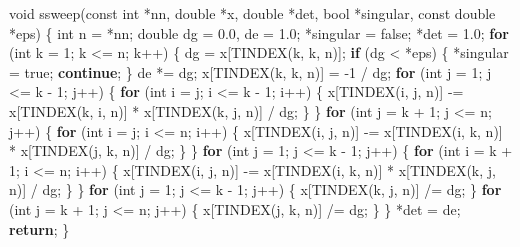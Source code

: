 \documentclass[12pt,]{article}
\newenvironment{Shaded}{\begin{snugshade}}{\end{snugshade}}
\newcommand{\ControlFlowTok}[1]{\textcolor[rgb]{0.13,0.29,0.53}{\textbf{#1}}}
\newcommand{\DataTypeTok}[1]{\textcolor[rgb]{0.13,0.29,0.53}{#1}}
\newcommand{\DecValTok}[1]{\textcolor[rgb]{0.00,0.00,0.81}{#1}}
\newcommand{\FloatTok}[1]{\textcolor[rgb]{0.00,0.00,0.81}{#1}}
\newcommand{\NormalTok}[1]{#1}
\begin{document}
\begin{Shaded}
\begin{Highlighting}[]
{{{{{{\DataTypeTok{void}\NormalTok{ ssweep(}\DataTypeTok{const} \DataTypeTok{int}\NormalTok{ *nn, }\DataTypeTok{double}\NormalTok{ *x, }\DataTypeTok{double}\NormalTok{ *det, }\DataTypeTok{bool}\NormalTok{ *singular,}
            \DataTypeTok{const} \DataTypeTok{double}\NormalTok{ *eps) \{}
  \DataTypeTok{int}\NormalTok{ n = *nn;}
  \DataTypeTok{double}\NormalTok{ dg = }\FloatTok{0.0}\NormalTok{, de = }\FloatTok{1.0}\NormalTok{;}
\NormalTok{  *singular = false;}
\NormalTok{  *det = }\FloatTok{1.0}\NormalTok{;}
  \ControlFlowTok{for}\NormalTok{ (}\DataTypeTok{int}\NormalTok{ k = }\DecValTok{1}\NormalTok{; k <= n; k++) \{}
\NormalTok{    dg = x[TINDEX(k, k, n)];}
    \ControlFlowTok{if}\NormalTok{ (dg < *eps) \{}
\NormalTok{      *singular = true;}
      \ControlFlowTok{continue}\NormalTok{;}
\NormalTok{    \}}
\NormalTok{    de *= dg;}
\NormalTok{    x[TINDEX(k, k, n)] = }\DecValTok{-1}\NormalTok{ / dg;}
    \ControlFlowTok{for}\NormalTok{ (}\DataTypeTok{int}\NormalTok{ j = }\DecValTok{1}\NormalTok{; j <= k - }\DecValTok{1}\NormalTok{; j++) \{}
      \ControlFlowTok{for}\NormalTok{ (}\DataTypeTok{int}\NormalTok{ i = j; i <= k - }\DecValTok{1}\NormalTok{; i++) \{}
\NormalTok{        x[TINDEX(i, j, n)] -= x[TINDEX(k, i, n)] * x[TINDEX(k, j, n)] / dg;}
\NormalTok{      \}}
\NormalTok{    \}}
    \ControlFlowTok{for}\NormalTok{ (}\DataTypeTok{int}\NormalTok{ j = k + }\DecValTok{1}\NormalTok{; j <= n; j++) \{}
      \ControlFlowTok{for}\NormalTok{ (}\DataTypeTok{int}\NormalTok{ i = j; i <= n; i++) \{}
\NormalTok{        x[TINDEX(i, j, n)] -= x[TINDEX(i, k, n)] * x[TINDEX(j, k, n)] / dg;}
\NormalTok{      \}}
\NormalTok{    \}}
    \ControlFlowTok{for}\NormalTok{ (}\DataTypeTok{int}\NormalTok{ j = }\DecValTok{1}\NormalTok{; j <= k - }\DecValTok{1}\NormalTok{; j++) \{}
      \ControlFlowTok{for}\NormalTok{ (}\DataTypeTok{int}\NormalTok{ i = k + }\DecValTok{1}\NormalTok{; i <= n; i++) \{}
\NormalTok{        x[TINDEX(i, j, n)] -= x[TINDEX(i, k, n)] * x[TINDEX(k, j, n)] / dg;}
\NormalTok{      \}}
\NormalTok{    \}}
    \ControlFlowTok{for}\NormalTok{ (}\DataTypeTok{int}\NormalTok{ j = }\DecValTok{1}\NormalTok{; j <= k - }\DecValTok{1}\NormalTok{; j++) \{}
\NormalTok{      x[TINDEX(k, j, n)] /= dg;}
\NormalTok{    \}}
    \ControlFlowTok{for}\NormalTok{ (}\DataTypeTok{int}\NormalTok{ j = k + }\DecValTok{1}\NormalTok{; j <= n; j++) \{}
\NormalTok{      x[TINDEX(j, k, n)] /= dg;}
\NormalTok{    \}}
\NormalTok{  \}}
\NormalTok{  *det = de;}
  \ControlFlowTok{return}\NormalTok{;}
\NormalTok{\}}

}}}}}}
\end{Highlighting}
\end{Shaded}
\end{document}

